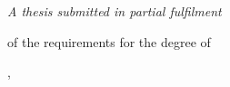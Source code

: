 %
%
%
\begin{titlepage}
    \centering
    {\large\university\par}
    \vspace{0.5em}
    {\large\department\par}
    \vfill
    {\parbox[b]{0.8\textwidth}{\centering\LARGE\textsc{\thetitle}}\par}
    \vspace{4em}
    {\Large\textsc{\theauthor}\par}
    \vfill
    {\large\itshape
        A thesis submitted in partial fulfilment\par
        of the requirements for the degree of\par
        \degree}
    \vfill
    \makeatletter
    {\large\DTMenglishmonthname{\@dtm@ini@month}, \@dtm@ini@year}
    \makeatother
\end{titlepage}
